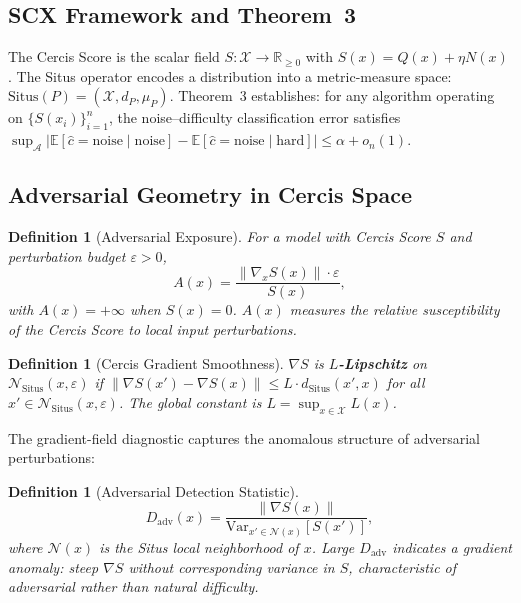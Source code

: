 \documentclass[12pt,a4paper]{article}
\newtheorem{definition}[theorem]{Definition}
\newcommand{\R}{\mathbb{R}}
\newcommand{\E}{\mathbb{E}}
\newcommand{\cX}{\mathcal{X}}
\newcommand{\cN}{\mathcal{N}}
\newcommand{\cA}{\mathcal{A}}
\newcommand{\Situs}{\mathrm{Situs}}
\begin{document}
\subsection{SCX Framework and Theorem~3}

The Cercis Score is the scalar field $S: \cX \to \R_{\geq 0}$ with
$S(x) = Q(x) + \eta N(x)$.  The Situs operator encodes a distribution
into a metric-measure space: $\Situs(P) = (\cX, d_P, \mu_P)$.  Theorem~3
establishes: for any algorithm operating on $\{S(x_i)\}_{i=1}^n$, the
noise--difficulty classification error satisfies
$\sup_{\cA} |\E[\hat{c} = \text{noise} \mid \text{noise}] -
\E[\hat{c} = \text{noise} \mid \text{hard}]| \leq \alpha + o_n(1)$.

\subsection{Adversarial Geometry in Cercis Space}

\begin{definition}[Adversarial Exposure]
\label{def:A}
For a model with Cercis Score $S$ and perturbation budget $\varepsilon > 0$,
\begin{equation}\label{eq:A-def}
    A(x) = \frac{\|\nabla_x S(x)\| \cdot \varepsilon}{S(x)},
\end{equation}
with $A(x) = +\infty$ when $S(x) = 0$.  $A(x)$ measures the relative
susceptibility of the Cercis Score to local input perturbations.
\end{definition}

\begin{definition}[Cercis Gradient Smoothness]
\label{def:lipschitz}
$\nabla S$ is \textbf{$L$-Lipschitz} on $\cN_{\Situs}(x, \varepsilon)$ if
$\|\nabla S(x') - \nabla S(x)\| \leq L \cdot d_{\Situs}(x', x)$ for all
$x' \in \cN_{\Situs}(x, \varepsilon)$.  The global constant is
$L = \sup_{x \in \cX} L(x)$.
\end{definition}

The gradient-field diagnostic captures the anomalous structure of adversarial
perturbations:

\begin{definition}[Adversarial Detection Statistic]
\label{def:D-adv}
\begin{equation}\label{eq:D-adv}
    D_{\mathrm{adv}}(x) =
    \frac{\|\nabla S(x)\|}
         {\mathrm{Var}_{x' \in \cN(x)}[S(x')]},
\end{equation}
where $\cN(x)$ is the Situs local neighborhood of $x$.  Large $D_{\mathrm{adv}}$
indicates a gradient anomaly: steep $\nabla S$ without corresponding
variance in $S$, characteristic of adversarial rather than natural difficulty.
\end{definition}
\end{document}
